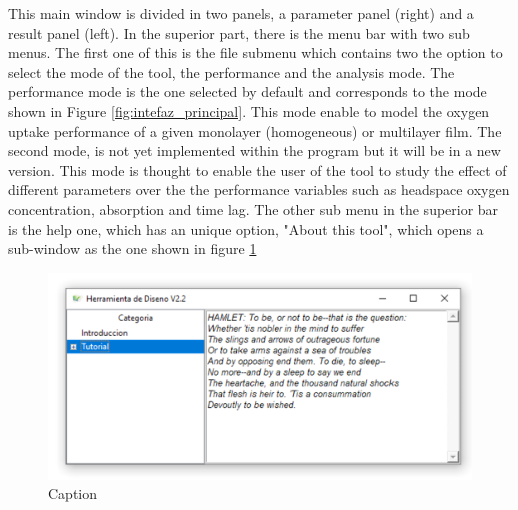 This main window is divided in two panels, a parameter panel (right) and a result panel (left). In the superior part, there is the menu bar with two sub menus. The first one of this is the file submenu which contains two the option to select the mode of the tool, the performance and the analysis mode. The performance mode is the one selected by default and corresponds to the mode shown in Figure \ref{fig:intefaz_principal}. This mode enable to model the oxygen uptake performance of a given monolayer (homogeneous) or multilayer film. The second mode, is not yet implemented within the program but it will be in a new version. This mode is thought to enable the user of the tool to study the effect of different parameters over the the performance variables such as headspace oxygen concentration, absorption and time lag. The other sub menu in the superior bar is the help one, which has an unique option, "About this tool", which opens a sub-window as the one shown in figure \ref{fig:help_window}
 \begin{figure}[H]
     \centering
     \includegraphics[width=0.8\linewidth]{Documento_Latex/Imagenes/menu_ayuda.png}
     \caption{Caption}
     \label{fig:help_window}
 \end{figure}
